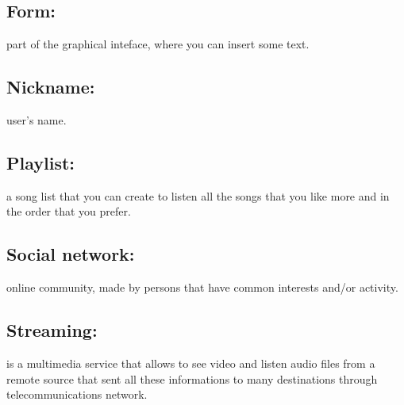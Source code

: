 \subsection*{Form:} part of the graphical inteface, where you can insert some
text. 
\subsection*{Nickname:} user's name.
\subsection*{Playlist:} a song list that you can create to listen all the songs
that you like more and in the order that you prefer. 
\subsection*{Social network:} online community, made by persons that have common interests
and/or activity.
\subsection*{Streaming:} is a multimedia service that allows to see video and
listen audio files from a remote source that sent all these informations to
many destinations through telecommunications network.

